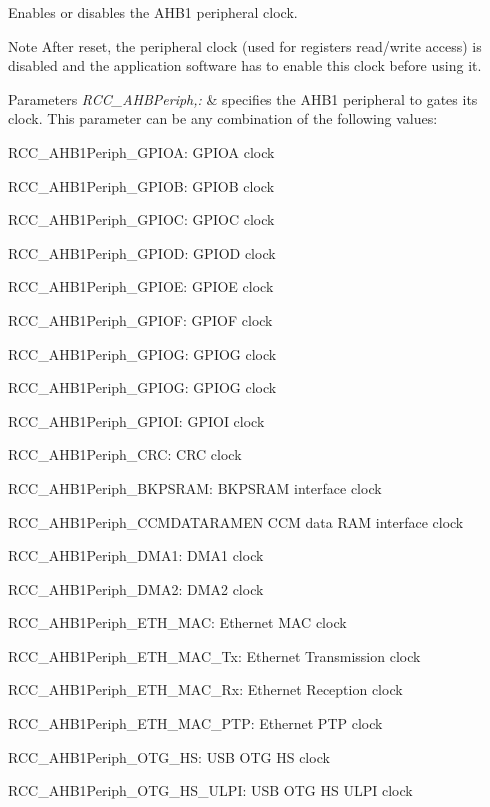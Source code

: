 Enables or disables the A\-H\-B1 peripheral clock. 

\begin{DoxyNote}{Note}
After reset, the peripheral clock (used for registers read/write access) is disabled and the application software has to enable this clock before using it. 
\end{DoxyNote}

\begin{DoxyParams}{Parameters}
{\em R\-C\-C\-\_\-\-A\-H\-B\-Periph,\-:} & specifies the A\-H\-B1 peripheral to gates its clock. This parameter can be any combination of the following values\-: \begin{DoxyItemize}
\item R\-C\-C\-\_\-\-A\-H\-B1\-Periph\-\_\-\-G\-P\-I\-O\-A\-: G\-P\-I\-O\-A clock \item R\-C\-C\-\_\-\-A\-H\-B1\-Periph\-\_\-\-G\-P\-I\-O\-B\-: G\-P\-I\-O\-B clock \item R\-C\-C\-\_\-\-A\-H\-B1\-Periph\-\_\-\-G\-P\-I\-O\-C\-: G\-P\-I\-O\-C clock \item R\-C\-C\-\_\-\-A\-H\-B1\-Periph\-\_\-\-G\-P\-I\-O\-D\-: G\-P\-I\-O\-D clock \item R\-C\-C\-\_\-\-A\-H\-B1\-Periph\-\_\-\-G\-P\-I\-O\-E\-: G\-P\-I\-O\-E clock \item R\-C\-C\-\_\-\-A\-H\-B1\-Periph\-\_\-\-G\-P\-I\-O\-F\-: G\-P\-I\-O\-F clock \item R\-C\-C\-\_\-\-A\-H\-B1\-Periph\-\_\-\-G\-P\-I\-O\-G\-: G\-P\-I\-O\-G clock \item R\-C\-C\-\_\-\-A\-H\-B1\-Periph\-\_\-\-G\-P\-I\-O\-G\-: G\-P\-I\-O\-G clock \item R\-C\-C\-\_\-\-A\-H\-B1\-Periph\-\_\-\-G\-P\-I\-O\-I\-: G\-P\-I\-O\-I clock \item R\-C\-C\-\_\-\-A\-H\-B1\-Periph\-\_\-\-C\-R\-C\-: C\-R\-C clock \item R\-C\-C\-\_\-\-A\-H\-B1\-Periph\-\_\-\-B\-K\-P\-S\-R\-A\-M\-: B\-K\-P\-S\-R\-A\-M interface clock \item R\-C\-C\-\_\-\-A\-H\-B1\-Periph\-\_\-\-C\-C\-M\-D\-A\-T\-A\-R\-A\-M\-E\-N C\-C\-M data R\-A\-M interface clock \item R\-C\-C\-\_\-\-A\-H\-B1\-Periph\-\_\-\-D\-M\-A1\-: D\-M\-A1 clock \item R\-C\-C\-\_\-\-A\-H\-B1\-Periph\-\_\-\-D\-M\-A2\-: D\-M\-A2 clock \item R\-C\-C\-\_\-\-A\-H\-B1\-Periph\-\_\-\-E\-T\-H\-\_\-\-M\-A\-C\-: Ethernet M\-A\-C clock \item R\-C\-C\-\_\-\-A\-H\-B1\-Periph\-\_\-\-E\-T\-H\-\_\-\-M\-A\-C\-\_\-\-Tx\-: Ethernet Transmission clock \item R\-C\-C\-\_\-\-A\-H\-B1\-Periph\-\_\-\-E\-T\-H\-\_\-\-M\-A\-C\-\_\-\-Rx\-: Ethernet Reception clock \item R\-C\-C\-\_\-\-A\-H\-B1\-Periph\-\_\-\-E\-T\-H\-\_\-\-M\-A\-C\-\_\-\-P\-T\-P\-: Ethernet P\-T\-P clock \item R\-C\-C\-\_\-\-A\-H\-B1\-Periph\-\_\-\-O\-T\-G\-\_\-\-H\-S\-: U\-S\-B O\-T\-G H\-S clock \item R\-C\-C\-\_\-\-A\-H\-B1\-Periph\-\_\-\-O\-T\-G\-\_\-\-H\-S\-\_\-\-U\-L\-P\-I\-: U\-S\-B O\-T\-G H\-S U\-L\-P\-I clock \end{DoxyItemize}

\end{DoxyParams}
